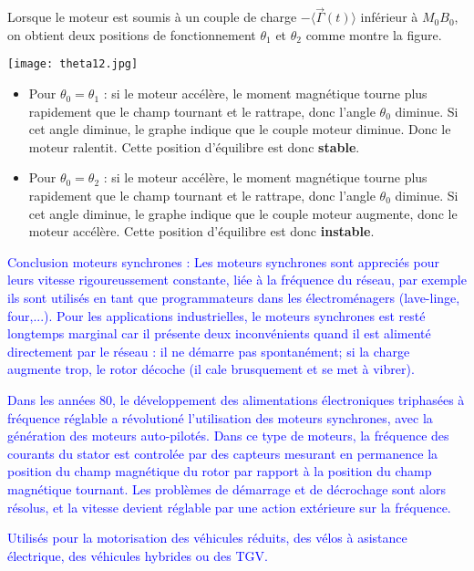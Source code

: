 \documentclass[12pt,prb,aps,epsf]{article}
\begin{document}
Lorsque le moteur est soumis à un couple de charge $-\langle \vec{\Gamma}(t) \rangle$ inférieur à $M_0 B_0$, on obtient deux positions de fonctionnement $\theta_1$ et $\theta_2$ comme montre la figure.


\begin{center}
    \texttt{[image: theta12.jpg]}
\end{center}


\begin{itemize}
    \item Pour $\theta_0 = \theta_1$ : si le moteur accélère, le moment magnétique tourne plus rapidement que le champ tournant et le rattrape, donc l'angle $\theta_0$ diminue. Si cet angle diminue, le graphe indique que le couple moteur diminue. Donc le moteur ralentit. Cette position d'équilibre est donc \textbf{stable}.
    \item Pour $\theta_0 = \theta_2$ : si le moteur accélère, le moment magnétique tourne plus rapidement que le champ tournant et le rattrape, donc l'angle $\theta_0$ diminue. Si cet angle diminue, le graphe indique que le couple moteur augmente, donc le moteur accélère. Cette position d'équilibre est donc \textbf{instable}.
\end{itemize}

\textcolor{blue}{Conclusion moteurs synchrones : Les moteurs synchrones sont appreciés pour leurs vitesse rigoureussement constante, liée à la fréquence du réseau, par exemple ils sont utilisés en tant que programmateurs dans les électroménagers (lave-linge, four,...). Pour les applications industrielles, le moteurs synchrones est resté longtemps marginal car il présente deux inconvénients quand il est alimenté directement par le réseau : il ne démarre pas spontanément; si la charge augmente trop, le rotor décoche (il cale brusquement et se met à vibrer).}\medskip

\textcolor{blue}{Dans les années 80, le développement des alimentations électroniques triphasées à fréquence réglable a révolutioné l'utilisation des moteurs synchrones, avec la génération des moteurs auto-pilotés. Dans ce type de moteurs, la fréquence des courants du stator est controlée par des capteurs mesurant en permanence la position du champ magnétique du rotor par rapport à la position du champ magnétique tournant. Les problèmes de démarrage et de décrochage sont alors résolus, et la vitesse devient réglable par une action extérieure sur la fréquence.}

\textcolor{blue}{Utilisés pour la motorisation des véhicules réduits, des vélos à asistance électrique, des véhicules hybrides ou des TGV.}
\end{document}
